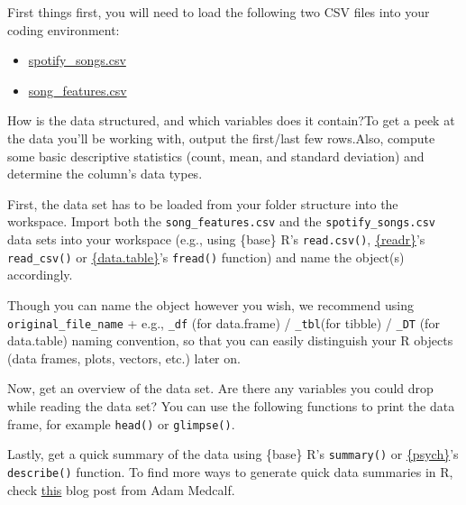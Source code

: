 \documentclass[
  11pt,
]{book}
\providecommand{\tightlist}{%
  \setlength{\itemsep}{0pt}\setlength{\parskip}{0pt}}
\newenvironment{tips}[1]
  {
  \begin{itemize}
  \footnotesize
  \renewcommand{\labelitemi}{
    \raisebox{-.7\height}[0pt][0pt]{
      {\setkeys{Gin}{width=3em,keepaspectratio}
        \texttt{[image: images/\#1.png]}}
    }
  }
  \setlength{\fboxsep}{1em}
  \begin{rbox}
  \item
  }
  {
  \end{rbox}
  \end{itemize}
  }
\begin{document}
First things first, you will need to load the following two CSV files into your coding environment:

\begin{itemize}
\tightlist
\item
  \href{https://drive.google.com/uc?export=download\&id=1OmFrdUaPFatpPLRikLJHS-VoF1F27G73}{spotify\_songs.csv}
\item
  \href{https://drive.google.com/uc?export=download\&id=1gHO566_qxBbz7t8fcH10uVQDAmxK33IF}{song\_features.csv}
\end{itemize}

How is the data structured, and which variables does it contain?To get a peek at the data you'll be working with, output the first/last few rows.Also, compute some basic descriptive statistics (count, mean, and standard deviation) and determine the column's data types.

\begin{tips}r

First, the data set has to be loaded from your folder structure into the workspace. Import both the \texttt{song\_features.csv} and the \texttt{spotify\_songs.csv} data sets into your workspace (e.g., using \{base\} R's \texttt{read.csv()}, \href{https://readr.tidyverse.org}{\{readr\}}'s \texttt{read\_csv()} or \href{https://rdatatable.gitlab.io/data.table/}{\{data.table\}}'s \texttt{fread()} function) and name the object(s) accordingly.

Though you can name the object however you wish, we recommend using \texttt{original\_file\_name} + e.g., \texttt{\_df} (for data.frame) / \texttt{\_tbl}(for tibble) / \texttt{\_DT} (for data.table) naming convention, so that you can easily distinguish your R objects (data frames, plots, vectors, etc.) later on.

Now, get an overview of the data set. Are there any variables you could drop while reading the data set? You can use the following functions to print the data frame, for example \texttt{head()} or \texttt{glimpse()}.

Lastly, get a quick summary of the data using \{base\} R's \texttt{summary()} or \href{https://personality-project.org/r/psych/}{\{psych\}}'s \texttt{describe()} function.
To find more ways to generate quick data summaries in R, check \href{https://dabblingwithdata.wordpress.com/2018/01/02/my-favourite-r-package-for-summarising-data/}{this} blog post from Adam Medcalf.

\end{tips}
\end{document}
